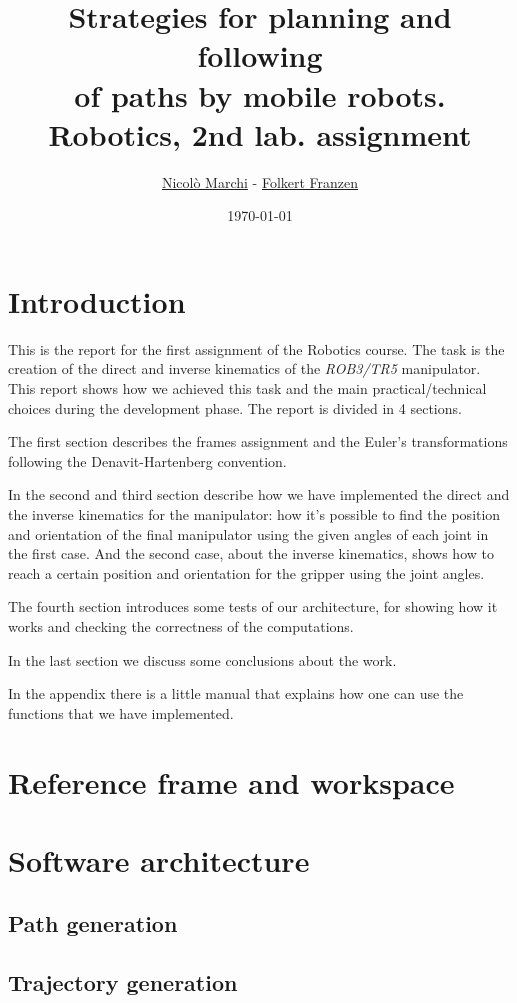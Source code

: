 \documentclass[a4paper,11pt]{article}
\title{\bf{Strategies for planning and following \\of paths by mobile robots. \\ Robotics, 2nd lab. assignment}}
\author{\href{mailto:marchi.nicolo@gmail.com}{Nicolò Marchi} - \href{mailto:folkert.franzen@gmx.de}{Folkert Franzen}}
\date{\today}
\begin{document}
\maketitle

\section{Introduction}

This is the report for the first assignment of the Robotics course. The task is the creation of the direct and inverse kinematics of the \emph{ROB3/TR5} manipulator. This report shows how we achieved this task and the main practical/technical choices during the development phase. The report is divided in 4 sections. 

The first section describes the frames assignment and the Euler's transformations following the Denavit-Hartenberg convention.

In the second and third section describe how we have implemented the direct and the inverse kinematics for the manipulator: how it's possible to find the position and orientation of the final manipulator using the given angles of each joint in the first case. And the second case, about the inverse kinematics, shows how to reach a certain position and orientation for the gripper using the joint angles.

The fourth section introduces some tests of our architecture, for showing how it works and checking the correctness of the computations.

In the last section we discuss some conclusions about the work.

In the appendix there is a little manual that explains how one can use the functions that we have implemented.

\section{Reference frame and workspace}

\section{Software architecture}
\subsection{Path generation}
\subsection{Trajectory generation}
\end{document}
